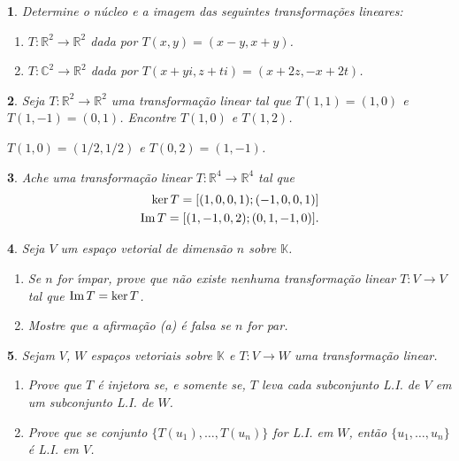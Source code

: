 \documentclass[12pt]{exam}
\newtheorem{exercicio}{}
\newcommand{\im}{{\rm Im\,}}
\newcommand{\real}{\mathbb{R}}
\newcommand{\complex}{\mathbb{C}}
\newcommand{\cp}[1]{\mathbb{#1}}
\begin{document}
\begin{exercicio}
  Determine o n\'ucleo e a imagem das seguintes transforma\c{c}\~oes lineares:
  \begin{enumerate}[label=({\alph*})]
    \item $T : \real^2 \to \real^2$ dada por $T(x,y) = (x - y, x + y)$.
    \item $T : \complex^2 \to \real^2$ dada por $T(x + yi,z + ti) = (x + 2z, -x + 2t)$.
  \end{enumerate}
\end{exercicio}

\begin{exercicio}
  Seja $T : \real^2 \to \real^2$ uma transforma\c{c}\~ao linear tal que $T(1,1) = (1,0)$ e $T(1,-1) = (0,1)$. Encontre $T(1,0)$ e $T(1,2)$.
  \begin{solucao}
    $T(1,0) = (1/2,1/2)$ e $T(0,2) = (1,-1)$.
  \end{solucao}
\end{exercicio}

\begin{exercicio}
  Ache uma transforma\c{c}\~ao linear $T : \real^4 \to \real^4$ tal que
  \begin{align*}
    \ker T = [(1,0,0,1);(-1,0,0,1)]\\
    \im T = [(1,-1,0,2);(0,1,-1,0)].
  \end{align*}
\end{exercicio}

\begin{exercicio}
  Seja $V$ um espa\c{c}o vetorial de dimens\~ao $n$ sobre $\cp{K}$.
  \begin{enumerate}[label=({\alph*})]
    \item Se $n$ for {\'\i}mpar, prove que n\~ao existe nenhuma transforma\c{c}\~ao linear $T : V \to V$ tal que $\im T = \ker T$.
    \item Mostre que a afirma\c{c}\~ao (a) \'e falsa se $n$ for par.
  \end{enumerate}
\end{exercicio}

\begin{exercicio}
  Sejam $V$, $W$ espa\c{c}os vetoriais sobre $\cp{K}$ e $T : V \to W$ uma transforma\c{c}\~ao linear.
  \begin{enumerate}[label=({\alph*})]
    \item Prove que $T$ \'e injetora se, e somente se, $T$ leva cada subconjunto L.I. de $V$ em um subconjunto L.I. de $W$.
    \item Prove que se  conjunto $\{T(u_1),\dots,T(u_n)\}$ for L.I. em $W$, ent\~ao $\{u_1,\dots,u_n\}$ \'e L.I. em $V$.
  \end{enumerate}
\end{exercicio}
\end{document}
